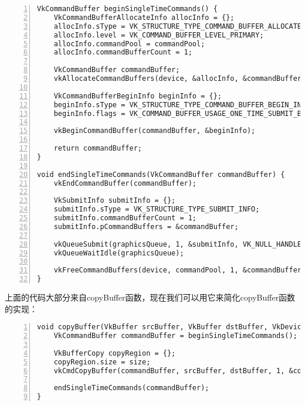 \documentclass{ctexart}
\begin{document}
\begin{lstlisting}[language={[ANSI]C},keywordstyle=\color{blue!70},commentstyle=\color{red!50!green!50!blue!50},frame=shadowbox, rulesepcolor=\color{red!20!green!20!blue!20},basicstyle=\small,numbers=left, numberstyle=\tiny,breaklines=true]
VkCommandBuffer beginSingleTimeCommands() {
	VkCommandBufferAllocateInfo allocInfo = {};
	allocInfo.sType = VK_STRUCTURE_TYPE_COMMAND_BUFFER_ALLOCATE_INFO;
	allocInfo.level = VK_COMMAND_BUFFER_LEVEL_PRIMARY;
	allocInfo.commandPool = commandPool;
	allocInfo.commandBufferCount = 1;

	VkCommandBuffer commandBuffer;
	vkAllocateCommandBuffers(device, &allocInfo, &commandBuffer);

	VkCommandBufferBeginInfo beginInfo = {};
	beginInfo.sType = VK_STRUCTURE_TYPE_COMMAND_BUFFER_BEGIN_INFO;
	beginInfo.flags = VK_COMMAND_BUFFER_USAGE_ONE_TIME_SUBMIT_BIT;

	vkBeginCommandBuffer(commandBuffer, &beginInfo);

	return commandBuffer;
}

void endSingleTimeCommands(VkCommandBuffer commandBuffer) {
	vkEndCommandBuffer(commandBuffer);

	VkSubmitInfo submitInfo = {};
	submitInfo.sType = VK_STRUCTURE_TYPE_SUBMIT_INFO;
	submitInfo.commandBufferCount = 1;
	submitInfo.pCommandBuffers = &commandBuffer;

	vkQueueSubmit(graphicsQueue, 1, &submitInfo, VK_NULL_HANDLE);
	vkQueueWaitIdle(graphicsQueue);

	vkFreeCommandBuffers(device, commandPool, 1, &commandBuffer);
}
\end{lstlisting}

上面的代码大部分来自copyBuffer函数，现在我们可以用它来简化copyBuffer函数的实现：

\begin{lstlisting}[language={[ANSI]C},keywordstyle=\color{blue!70},commentstyle=\color{red!50!green!50!blue!50},frame=shadowbox, rulesepcolor=\color{red!20!green!20!blue!20},basicstyle=\small,numbers=left, numberstyle=\tiny,breaklines=true]
void copyBuffer(VkBuffer srcBuffer, VkBuffer dstBuffer, VkDeviceSize size) {
	VkCommandBuffer commandBuffer = beginSingleTimeCommands();

	VkBufferCopy copyRegion = {};
	copyRegion.size = size;
	vkCmdCopyBuffer(commandBuffer, srcBuffer, dstBuffer, 1, &copyRegion);

	endSingleTimeCommands(commandBuffer);
}
\end{lstlisting}
\end{document}
